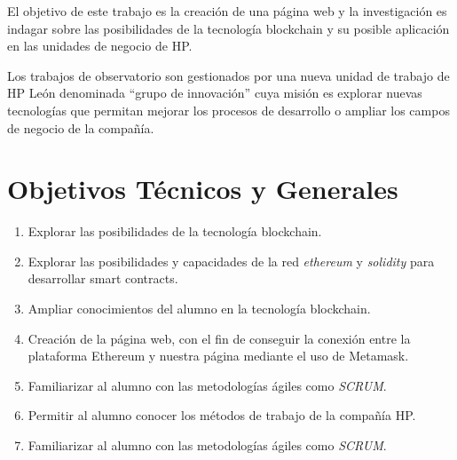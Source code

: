 
El objetivo de este trabajo es la creación de una página web y la investigación es indagar sobre las posibilidades de la tecnología blockchain y su posible aplicación en las unidades de negocio de HP.

Los trabajos de observatorio son gestionados por una nueva unidad de trabajo de HP León denominada ``grupo de innovación'' cuya misión es explorar nuevas tecnologías que permitan mejorar los procesos de desarrollo o ampliar los campos de negocio de la compañía.

\section{Objetivos Técnicos y Generales}

\begin{enumerate}[1]
	\item Explorar las posibilidades de la tecnología blockchain.
	\item Explorar las posibilidades y capacidades de la red \textit{ethereum} y \textit{solidity} para desarrollar smart contracts.
	\item Ampliar conocimientos del alumno en la tecnología blockchain.
	\item Creación de la página web, con el fin de conseguir la conexión entre la plataforma Ethereum y nuestra página mediante el uso de Metamask.
	\item Familiarizar al alumno con las metodologías ágiles como \textit{SCRUM}.
	\item Permitir al alumno conocer los métodos de trabajo de la compañía HP.
	\item Familiarizar al alumno con las metodologías ágiles como \textit{SCRUM}.
\end{enumerate}